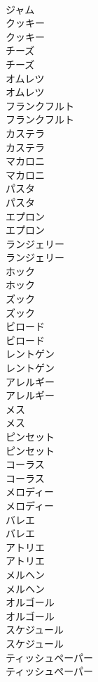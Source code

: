 \documentclass[8pt]{extreport}
\begin{document}
\begin{CJK}{UTF8}{min}
\\	ジャム		
\\	クッキー	
\\	クッキー		
\\	チーズ	
\\	チーズ		
\\	オムレツ	
\\	オムレツ		
\\	フランクフルト	
\\	フランクフルト		
\\	カステラ	
\\	カステラ		
\\	マカロニ	
\\	マカロニ		
\\	パスタ	
\\	パスタ		
\\	エプロン	
\\	エプロン		
\\	ランジェリー	
\\	ランジェリー		
\\	ホック	
\\	ホック		
\\	ズック	
\\	ズック		
\\	ビロード	
\\	ビロード		
\\	レントゲン	
\\	レントゲン		
\\	アレルギー	
\\	アレルギー		
\\	メス	
\\	メス		
\\	ピンセット	
\\	ピンセット		
\\	コーラス	
\\	コーラス		
\\	メロディー	
\\	メロディー		
\\	バレエ	
\\	バレエ		
\\	アトリエ	
\\	アトリエ		
\\	メルヘン	
\\	メルヘン		
\\	オルゴール	
\\	オルゴール		
\\	スケジュール	
\\	スケジュール		
\\	ティッシュペーパー	
\\	ティッシュペーパー		

\end{CJK}
\end{document}
